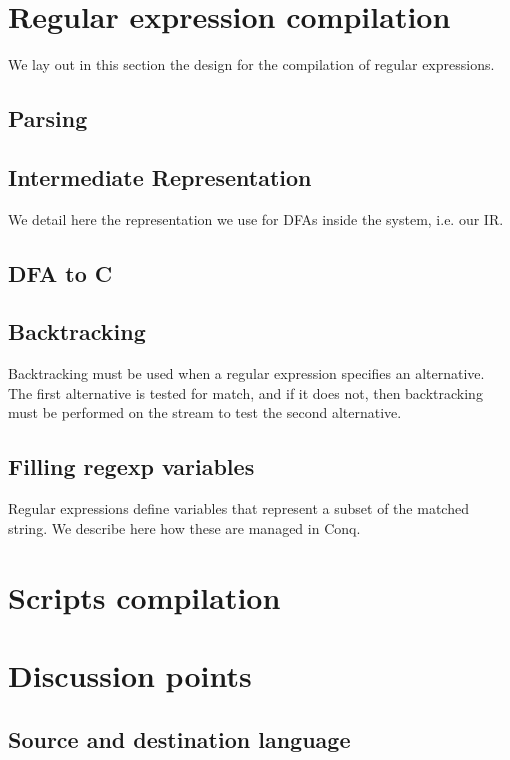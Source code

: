 \documentclass[11pt,a4paper]{report}
\begin{document}
\chapter{Regular expression compilation}

We lay out in this section the design for the compilation of regular expressions.

\section{Parsing}

\section{Intermediate Representation}

We detail here the representation we use for DFAs inside the system, i.e. our IR.

\section{DFA to C}

\section{Backtracking}

Backtracking must be used when a regular expression specifies an alternative. The first alternative is tested for match, and if it does not, then backtracking must be performed on the stream to test the second alternative.

\section{Filling regexp variables}

Regular expressions define variables that represent a subset of the matched string. We describe here how these are managed in Conq.

\chapter{Scripts compilation}

\chapter{Discussion points}

\section{Source and destination language}
\end{document}
